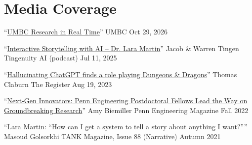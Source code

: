 

\section*{{} Media Coverage}






  \cvmedia
    {``\href{https://www.youtube.com/shorts/6VMyPZJDzUY}{UMBC Research in Real Time}''} %
    {} %
    {UMBC} %
    {Oct 29, 2026} %

  \cvmedia
    {``\href{https://youtu.be/K5cAzLGaDo8?si=sRf4fcP3jCiNWdDn}{Interactive Storytelling with AI – Dr. Lara Martin}''} %
    {Jacob \& Warren Tingen} %
    {Tingenuity AI (podcast)} %
    {Jul 11, 2025} %

  \cvmedia
    {``\href{https://www.theregister.com/2023/08/19/chatgpt_dnd_dm/}{Hallucinating ChatGPT finds a role playing Dungeons \& Dragons}''} %
    {Thomas Claburn} %
    {The Register} %
    {Aug 19, 2023} %

  \cvmedia
    {``\href{https://magazine.seas.upenn.edu/fall-2022/next-gen-innovators/}{Next-Gen Innovators: Penn Engineering Postdoctoral Fellows Lead the Way on Groundbreaking Research}''} %
    {Amy Biemiller} %
    {Penn Engineering Magazine} %
    {Fall 2022} %

  \cvmedia
    {``\href{https://magazine.tank.tv/issue-88/talk/lara-martin}{Lara Martin: ``How can I get a system to tell a story about anything I want?''}''} %
    {Masoud Golsorkhi} %
    {TANK Magazine, Issue 88 (Narrative)} %
    {Autumn 2021} %

